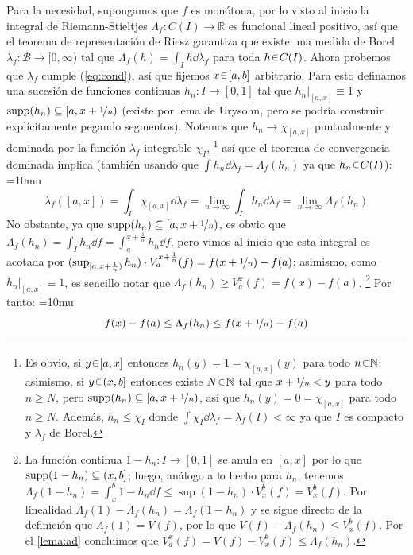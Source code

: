 \begin{sol}
\begin{enumerate}[label=(\roman*),leftmargin=1.8em]
Para la necesidad, supongamos que $f$ es monótona, por lo visto al inicio la integral de Riemann-Stieltjes $\Lambda_f \colon C(I) \to \mathbb{R}$ es funcional lineal positivo, así que el teorema de representación de Riesz garantiza que existe una medida de Borel $\lambda_f \colon \mathcal{B} \to [0,\infty)$ tal que $\Lambda_f(h) = \int_I h \dd{\lambda_f}$ para toda $h\en C(I)$. Ahora probemos que $\lambda_f$ cumple (\ref{eq:cond}), así que fijemos $x\en[a,b]$ arbitrario. Para esto definamos una sucesión de funciones continuas $h_n\colon I \to [0,1]$ tal que $h_n|_{[a,x]} \equiv1$ y $\operatorname{supp}(h_n) \subseteq [a,x+\nicefrac{1}{n})$ (existe por lema de Urysohn, pero se podría construir explícitamente pegando segmentos). Notemos que $h_n\to\chi_{[a,x]}$ puntualmente y dominada por la función $\lambda_f$-integrable $\chi_I$,%
\footnote{
Es obvio, si $y\en [a,x]$ entonces $h_n(y) = 1= \chi_{[a,x]}(y)$ para todo $n\en\mathbb{N}$; asimismo, si $y\en(x,b]$ entonces existe $N\en\mathbb{N}$ tal que $x+\nicefrac{1}{n} < y$ para todo $n\ge N$, pero $\operatorname{supp}(h_n) \subseteq [a,x+\nicefrac{1}{n})$, así que $h_n(y) = 0 = \chi_{[a,x]}$ para todo $n\ge N$. Además, $h_n \le \chi_I$ donde $\int \chi_I \dd{\lambda_f} = \lambda_f(I) < \infty$ ya que $I$ es compacto y $\lambda_f$ de Borel.
} %
así que el teorema de convergencia dominada implica (también usando que $\int h_n\dd{\lambda_f} = \Lambda_f(h_n)$ ya que $h_n\en C(I)$):
{\thickmuskip=10mu
\[
\lambda_f([a,x]) 
= \int_I \chi_{[a,x]} \dd{\lambda_f}
= \lim_{n\to\infty}\int_I h_n \dd{\lambda_f}
= \lim_{n\to\infty}\Lambda_f(h_n)
\]
}%
No obstante, ya que $\operatorname{supp}(h_n) \subseteq [a,x+\nicefrac{1}{n})$, es obvio que $\Lambda_f(h_n) = \int_I h_n \dd{f} = \int^{x+\frac{1}{n}}_a h_n \dd{f}$, pero vimos al inicio que esta integral es acotada por $(\sup_{[a,x+\frac{1}{n})} h_n) \cdot V^{x+\frac{1}{n}}_a(f) = f(x+\nicefrac{1}{n}) - f(a)$; asimismo, como $h_n|_{[a,x]} \equiv1$, es sencillo notar que $\Lambda_f(h_n) \ge V^x_a(f) = f(x) - f(a)$.%
\footnote{
    La función continua $1-h_n \colon I \to [0,1]$ se anula en $[a,x]$ por lo que $\operatorname{supp}(1-h_n) \subseteq (x,b]$; luego, análogo a lo hecho para $h_n$, tenemos $\Lambda_f(1-h_n) = \int^b_x 1-h_n \dd{f} \le \sup(1-h_n)\cdot V^b_x(f) = V^b_x(f)$. Por linealidad $\Lambda_f(1) -\Lambda_f(h_n) = \Lambda_f(1-h_n)$ y se sigue directo de la definición que $\Lambda_f(1) = V(f)$, por lo que $V(f) -\Lambda_f(h_n)\le V^b_x(f)$. Por el \cref{lema:ad} concluimos que $V^x_a(f) = V(f) -V^b_x(f) \le \Lambda_f(h_n)$.
 }
Por tanto:
{\thickmuskip=10mu
\[
f(x) - f(a) \le \Lambda_f(h_n) \le f(x+\nicefrac{1}{n}) - f(a)
\]}
\end{enumerate}
\end{sol}
